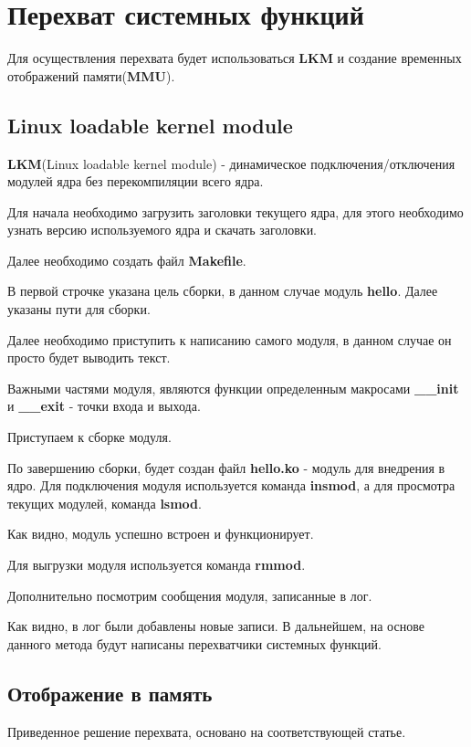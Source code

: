 \section{Перехват системных функций}
Для осуществления перехвата будет использоваться \textbf{LKM} и создание временных отображений памяти(\textbf{MMU}).
\subsection{Linux loadable kernel module}
\textbf{LKM}(Linux loadable kernel module) - динамическое подключения/отключения модулей ядра без перекомпиляции всего ядра.

Для начала необходимо загрузить заголовки текущего ядра, для этого необходимо узнать версию используемого ядра и скачать заголовки.


Далее необходимо создать файл \textbf{Makefile}.

В первой строчке указана цель сборки, в данном случае модуль \textbf{hello}. Далее указаны пути для сборки.

Далее необходимо приступить к написанию самого модуля, в данном случае он просто будет выводить текст.

Важными частями модуля, являются функции определенным макросами \textbf{\_\_init} и \textbf{\_\_exit} - точки входа и выхода\cite{lkm}.

Приступаем к сборке модуля.

По завершению сборки, будет создан файл \textbf{hello.ko} - модуль для внедрения в ядро. Для подключения модуля используется команда \textbf{insmod}, а для просмотра текущих модулей, команда \textbf{lsmod}.

Как видно, модуль успешно встроен и функционирует.

Для выгрузки модуля используется команда \textbf{rmmod}.

Дополнительно посмотрим сообщения модуля, записанные в лог.

Как видно, в лог были добавлены новые записи. В дальнейшем, на основе данного метода будут написаны перехватчики системных функций.
\subsection{Отображение в память}
Приведенное решение перехвата, основано на соответствующей статье\cite{habrHook}.

